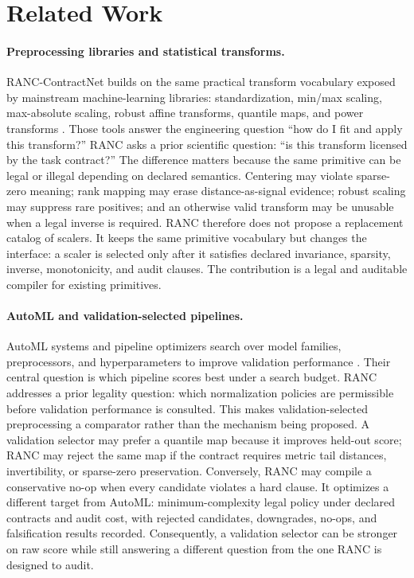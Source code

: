 \documentclass{article}
\begin{document}
\section{Related Work}

\paragraph{Preprocessing libraries and statistical transforms.}
RANC-ContractNet builds on the same practical transform vocabulary exposed by
mainstream machine-learning libraries: standardization, min/max scaling,
max-absolute scaling, robust affine transforms, quantile maps, and power
transforms \cite{pedregosa2011scikit,yeo2000new}. Those tools answer the
engineering question ``how do I fit and apply this transform?'' RANC asks a
prior scientific question: ``is this transform licensed by the task contract?''
The difference matters because the same primitive can be legal or illegal
depending on declared semantics. Centering may violate sparse-zero meaning;
rank mapping may erase distance-as-signal evidence; robust scaling may suppress
rare positives; and an otherwise valid transform may be unusable when a legal
inverse is required. RANC therefore does not propose a replacement catalog of
scalers. It keeps the same primitive vocabulary but changes the interface: a
scaler is selected only after it satisfies declared invariance, sparsity,
inverse, monotonicity, and audit clauses. The contribution is a legal and
auditable compiler for existing primitives.

\paragraph{AutoML and validation-selected pipelines.}
AutoML systems and pipeline optimizers search over model families,
preprocessors, and hyperparameters to improve validation performance
\cite{feurer2015automl,olson2016tpot}. Their central question is which pipeline
scores best under a search budget. RANC addresses a prior legality question:
which normalization policies are permissible before validation performance is
consulted. This makes validation-selected preprocessing a comparator rather
than the mechanism being proposed. A validation selector may prefer a quantile
map because it improves held-out score; RANC may reject the same map if the
contract requires metric tail distances, invertibility, or sparse-zero
preservation. Conversely, RANC may compile a conservative no-op when every
candidate violates a hard clause. It optimizes a different target from AutoML:
minimum-complexity legal policy under declared contracts and audit cost, with
rejected candidates, downgrades, no-ops, and falsification results recorded.
Consequently, a validation selector can be stronger on raw score while still
answering a different question from the one RANC is designed to audit.
\end{document}
